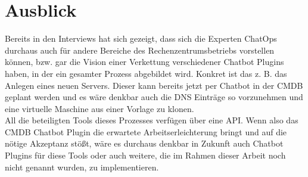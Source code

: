 \section{Ausblick}
Bereits in den Interviews hat sich gezeigt, dass sich die Experten ChatOps durchaus auch für andere Bereiche des Rechenzentrumsbetriebs vorstellen können, bzw. gar die Vision einer Verkettung verschiedener Chatbot Plugins haben, in der ein gesamter Prozess abgebildet wird. Konkret ist das z. B. das Anlegen eines neuen Servers. Dieser kann bereits jetzt per Chatbot in der \acs{CMDB} geplant werden und es wäre denkbar auch die DNS Einträge so vorzunehmen und eine virtuelle Maschine aus einer Vorlage zu klonen.\\
All die beteiligten Tools dieses Prozesses verfügen über eine \acs{API}. Wenn also das \acs{CMDB} Chatbot Plugin die erwartete Arbeitserleichterung bringt und auf die nötige Akzeptanz stößt, wäre es durchaus denkbar in Zukunft auch Chatbot Plugins für diese Tools oder auch weitere, die im Rahmen dieser Arbeit noch nicht genannt wurden, zu implementieren. 



